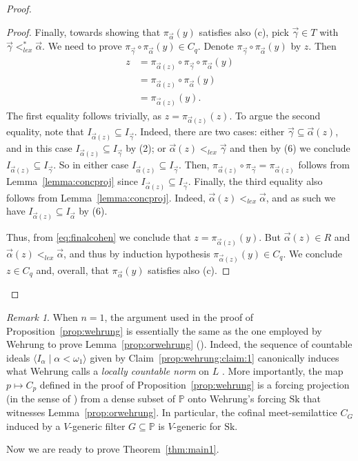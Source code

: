 \documentclass[]{amsart}
\theoremstyle{definition}
\theoremstyle{remark}
\newtheorem{remark}[theorem]{Remark}
\begin{document}
\begin{proof}
\begin{proof}
Finally, towards showing that $\pi_{\vec{\alpha}}(y)$ satisfies also (c), pick $\vec{\gamma} \in T$ with $\vec{\gamma} <^*_{lex} \vec{\alpha}$. We need to prove $\pi_{\vec{\gamma}} \circ \pi_{\vec{\alpha}}(y) \in C_q$. Denote $\pi_{\vec{\gamma}} \circ \pi_{\vec{\alpha}}(y) $ by $z$. Then
\begin{equation}\label{eq:finalcohen}
\begin{split}
z &= \pi_{\vec{\alpha}(z)} \circ \pi_{\vec{\gamma}} \circ \pi_{\vec{\alpha}} (y)\\
&= \pi_{\vec{\alpha}(z)} \circ \pi_{\vec{\alpha}} (y)\\
&= \pi_{\vec{\alpha}(z)}(y).
\end{split}
\end{equation}
The first equality follows trivially, as $z = \pi_{\vec{\alpha}(z)} (z)$. To argue the second equality, note that $I_{\vec{\alpha}(z)} \subseteq I_{\vec{\gamma}}$. Indeed, there are two cases: either $\vec{\gamma} \subseteq \vec{\alpha}(z)$, and in this case $I_{\vec{\alpha}(z)} \subseteq I_{\vec{\gamma}}$ by (2); or $\vec{\alpha}(z) <_{lex} \vec{\gamma}$ and then by (6) we conclude $I_{\vec{\alpha}(z)} \subseteq I_{\vec{\gamma}}$. So in either case $I_{\vec{\alpha}(z)} \subseteq I_{\vec{\gamma}}$. Then, $\pi_{\vec{\alpha}(z)} \circ \pi_{\vec{\gamma}} = \pi_{\vec{\alpha}(z)}$ follows from Lemma~\ref{lemma:concproj} since $I_{\vec{\alpha}(z)} \subseteq I_{\vec{\gamma}}$. Finally, the third equality also follows from Lemma~\ref{lemma:concproj}. Indeed, $\vec{\alpha}(z)  <_{lex} \vec{\alpha}$, and as such we have $I_{\vec{\alpha}(z)} \subseteq I_{\vec{\alpha}}$ by (6).  

Thus, from \eqref{eq:finalcohen} we conclude that $z = \pi_{\vec{\alpha}(z)} (y)$. But $\vec{\alpha}(z) \in R$ and $\vec{\alpha}(z) <_{lex} \vec{\alpha}$, and thus by induction hypothesis $\pi_{\vec{\alpha}(z)} (y) \in C_q$. We conclude $z \in C_q$ and, overall, that $\pi_{\vec{\alpha}}(y)$ satisfies also (c).
\end{proof}
\end{proof}

\begin{remark}\label{rmk:Sk}
When $n = 1$, the argument used in the proof of Proposition~\ref{prop:wehrung} is essentially the same as the one employed by Wehrung to prove Lemma~\ref{prop:orwehrung} (\cite[Lemma 7.5]{MR2609217}). Indeed, the sequence of countable ideals $\langle I_\alpha \mid \alpha < \omega_1 \rangle$ given by Claim~\ref{prop:wehrung:claim:1} canonically induces what Wehrung calls a \emph{locally countable norm} on $L$ \cite[Definitions 6.1 and 7.3]{MR2609217}. More importantly, the map $p \mapsto C_p$ defined in the proof of Proposition~\ref{prop:wehrung} is a forcing projection (in the sense of \cite[Definition 5.2]{MR2768691}) from a dense subset of $\mathbb{P}$ onto Wehrung's forcing $\text{Sk}$ \cite[Definition 7.1]{MR2609217} that witnesses Lemma~\ref{prop:orwehrung}. In particular, the cofinal meet-semilattice $C_G$ induced by a $V$-generic filter $G \subseteq \mathbb{P}$ is $V$-generic for $\text{Sk}$.
\end{remark}
Now we are ready to prove Theorem~\ref{thm:main1}. 
\end{document}
